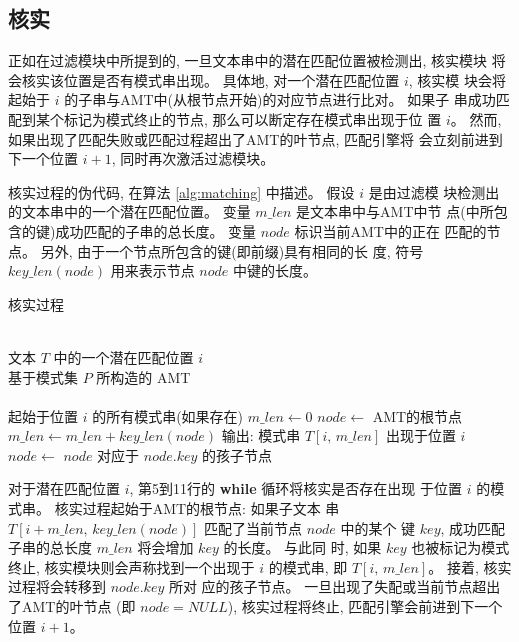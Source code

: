 \subsection{核实}
\label{subsec:matching}

正如在过滤模块中所提到的, 一旦文本串中的潜在匹配位置被检测出, 核实模块
将会核实该位置是否有模式串出现。 具体地, 对一个潜在匹配位置 $i$, 核实模
块会将起始于 $i$ 的子串与AMT中(从根节点开始)的对应节点进行比对。 如果子
串成功匹配到某个标记为模式终止的节点, 那么可以断定存在模式串出现于位
置 $i$。 然而, 如果出现了匹配失败或匹配过程超出了AMT的叶节点, 匹配引擎将
会立刻前进到下一个位置 $i+1$, 同时再次激活过滤模块。

核实过程的伪代码, 在算法 \ref{alg:matching} 中描述。 假设 $i$ 是由过滤模
块检测出的文本串中的一个潜在匹配位置。 变量 $m\_len$ 是文本串中与AMT中节
点(中所包含的键)成功匹配的子串的总长度。 变量 $node$ 标识当前AMT中的正在
匹配的节点。 另外, 由于一个节点所包含的键(即前缀)具有相同的长
度, 符号 $key\_len(node)$ 用来表示节点 $node$ 中键的长度。

\begin{algorithm}
  \caption{核实过程}
  \label{alg:matching}
  \begin{algorithmic}[1]
    \REQUIRE ~~\\
    文本 $T$ 中的一个潜在匹配位置 $i$ \\
    基于模式集 $P$ 所构造的 AMT\\
    \ENSURE ~~\\
    起始于位置 $i$ 的所有模式串(如果存在)
    \STATE
    \STATE $m\_len \leftarrow 0$
    \STATE $node \leftarrow $ AMT的根节点
    \STATE
    \STATE $m\_len \leftarrow m\_len + key\_len(node)$
    \STATE 输出: 模式串 $T[i,\,m\_len]$ 出现于位置 $i$
    \ENDIF
    \STATE $node \leftarrow$  $node$ 对应于 $node.key$ 的孩子节点
    \ENDWHILE
  \end{algorithmic}
\end{algorithm}

对于潜在匹配位置 $i$, 第5到11行的 \textbf{while} 循环将核实是否存在出现
于位置 $i$ 的模式串。 核实过程起始于AMT的根节点: 如果子文本
串 $T[i+m\_len, \, key\_len(node)]$ 匹配了当前节点 $node$ 中的某个
键 $key$, 成功匹配子串的总长度 $m\_len$ 将会增加 $key$ 的长度。 与此同
时, 如果 $key$ 也被标记为模式终止, 核实模块则会声称找到一个出现于 $i$
的模式串, 即 $T[i,\,m\_len]$。 接着, 核实过程将会转移到 $node.key$ 所对
应的孩子节点。 一旦出现了失配或当前节点超出了AMT的叶节点 (即 $node =
NULL$), 核实过程将终止, 匹配引擎会前进到下一个位置 $i+1$。

